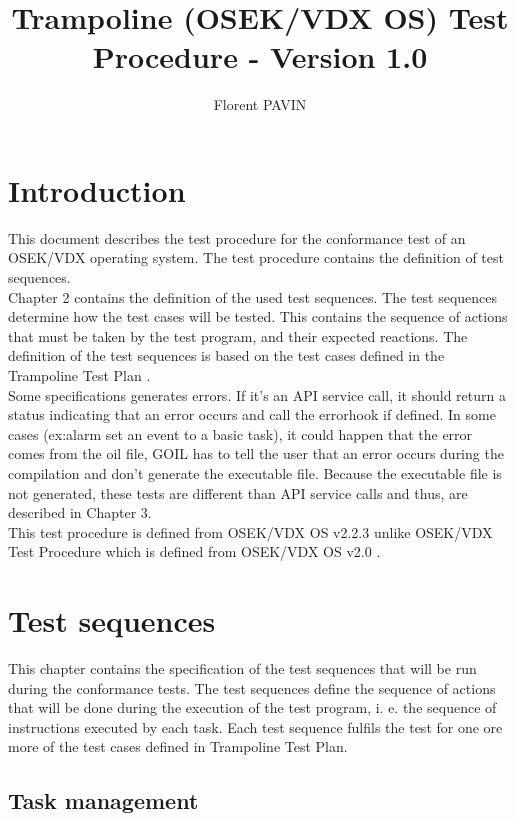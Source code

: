 \documentclass[10pt]{article}
\title{Trampoline (OSEK/VDX OS) Test Procedure - Version 1.0}
\author{Florent PAVIN}
\begin{document}
\maketitle
\tableofcontents

\newpage
\section{Introduction}

This document describes the test procedure for the conformance test of an OSEK/VDX operating system. The test procedure contains the definition of test sequences.\\
Chapter 2 contains the definition of the used test sequences. The test sequences determine how the test cases will be tested. This contains the sequence of actions that must be taken by the test program, and their expected reactions. The definition of the test sequences is based on the test cases defined in the Trampoline Test Plan \cite{TrampolineTestPlan_10}.\\
Some specifications generates errors. If it's an API service call, it should return a status indicating that an error occurs and call the errorhook if defined. In some cases (ex:alarm set an event to a basic task), it could happen that the error comes from the oil file, GOIL has to tell the user that an error occurs during the compilation and don't generate the executable file. Because the executable file is not generated, these tests are different than API service calls and thus, are described in Chapter 3.\\
This test procedure is defined from OSEK/VDX OS v2.2.3  \cite{OSEK_OS_223} unlike OSEK/VDX Test Procedure which is defined from OSEK/VDX OS v2.0 \cite{OSEK_OS_20}.\\

\newpage
\section{Test sequences}
This chapter contains the specification of the test sequences that will be run during the conformance  tests. The test sequences define the sequence of actions that will be done during the execution of the test program, i. e. the sequence of instructions executed by each task. Each test sequence fulfils the test for one ore more of the test cases defined in Trampoline Test Plan. \\

	\subsection{Task management}
		
\end{document}
